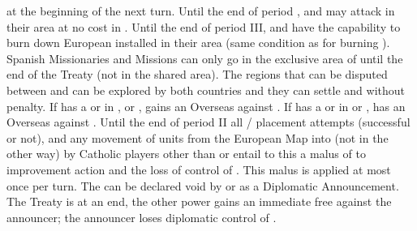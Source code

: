 at the beginning of the next turn.
\bparag Until the end of period , \SPA and \POR may attack
 in their area at no cost in \STAB.
\bparag Until the end of period III, \SPA and \POR have the capability to burn
down European \COL installed in their area (same condition as for burning
\TP).
\bparag Spanish Missionaries and Missions can only go in the exclusive area of
\SPA until the end of the Treaty (not in the shared area).
\bparag The regions that can be disputed between \POR and \SPA can be explored
by both countries and they can settle \COL and \TP without penalty.
\bparag If \POR has a \TP or \COL in \granderegionPhilippines,
\granderegionAmazonia or , \SPA gains an Overseas
\CB against \POR.
\bparag If \SPA has a \TP or \COL in \granderegionPhilippines or
, \POR has an Overseas \CB against \SPA.
 Until the end of period II all \COL/\TP
placement attempts (successful or not), and any movement of units from the
European Map into \ROTW (not in the other way) by Catholic players other than
\SPA or \POR entail to this \MAJ a malus of  to \STAB improvement
action and the loss of control of \payspapaute. This malus is applied at most
once per turn.
\aparag The  can be declared void by \POR or \SPA
as a Diplomatic Announcement. The Treaty is at an end, the other power gains
an immediate free  against the announcer; the announcer loses
diplomatic control of \payspapaute.





